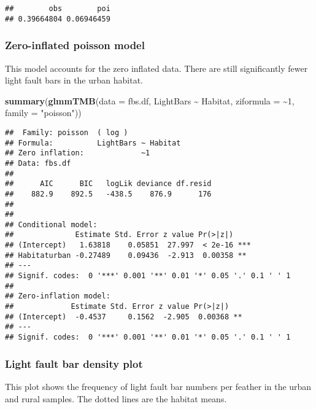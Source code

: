 \documentclass[
]{article}
\newenvironment{Shaded}{\begin{snugshade}}{\end{snugshade}}
\newcommand{\AttributeTok}[1]{\textcolor[rgb]{0.13,0.29,0.53}{#1}}
\newcommand{\DecValTok}[1]{\textcolor[rgb]{0.00,0.00,0.81}{#1}}
\newcommand{\FunctionTok}[1]{\textcolor[rgb]{0.13,0.29,0.53}{\textbf{#1}}}
\newcommand{\NormalTok}[1]{#1}
\newcommand{\SpecialCharTok}[1]{\textcolor[rgb]{0.81,0.36,0.00}{\textbf{#1}}}
\newcommand{\StringTok}[1]{\textcolor[rgb]{0.31,0.60,0.02}{#1}}
\begin{document}
\begin{verbatim}
##        obs        poi 
## 0.39664804 0.06946459
\end{verbatim}

\subsubsection{Zero-inflated poisson
model}\label{zero-inflated-poisson-model}

This model accounts for the zero inflated data. There are still
significantly fewer light fault bars in the urban habitat.

\begin{Shaded}
\begin{Highlighting}[]
\FunctionTok{summary}\NormalTok{(}\FunctionTok{glmmTMB}\NormalTok{(}\AttributeTok{data =}\NormalTok{ fbs.df, LightBars }\SpecialCharTok{\textasciitilde{}}\NormalTok{ Habitat, }\AttributeTok{ziformula =} \SpecialCharTok{\textasciitilde{}}\DecValTok{1}\NormalTok{, }\AttributeTok{family =} \StringTok{"poisson"}\NormalTok{))}
\end{Highlighting}
\end{Shaded}

\begin{verbatim}
##  Family: poisson  ( log )
## Formula:          LightBars ~ Habitat
## Zero inflation:             ~1
## Data: fbs.df
## 
##      AIC      BIC   logLik deviance df.resid 
##    882.9    892.5   -438.5    876.9      176 
## 
## 
## Conditional model:
##              Estimate Std. Error z value Pr(>|z|)    
## (Intercept)   1.63818    0.05851  27.997  < 2e-16 ***
## Habitaturban -0.27489    0.09436  -2.913  0.00358 ** 
## ---
## Signif. codes:  0 '***' 0.001 '**' 0.01 '*' 0.05 '.' 0.1 ' ' 1
## 
## Zero-inflation model:
##             Estimate Std. Error z value Pr(>|z|)   
## (Intercept)  -0.4537     0.1562  -2.905  0.00368 **
## ---
## Signif. codes:  0 '***' 0.001 '**' 0.01 '*' 0.05 '.' 0.1 ' ' 1
\end{verbatim}

\subsubsection{Light fault bar density
plot}\label{light-fault-bar-density-plot}

This plot shows the frequency of light fault bar numbers per feather in
the urban and rural samples. The dotted lines are the habitat means.

\begin{Shaded}
\end{Shaded}
\end{document}
